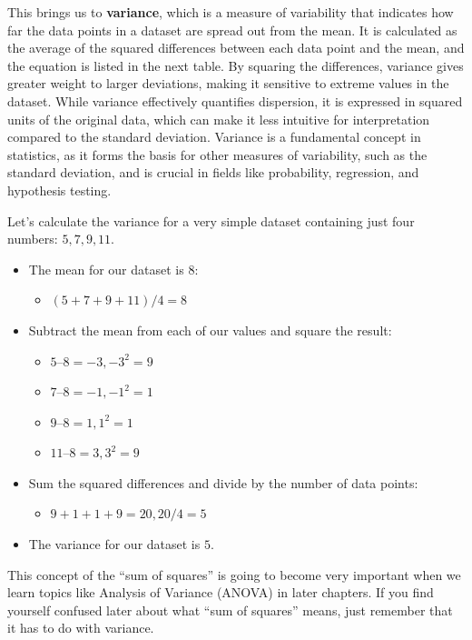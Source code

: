 \documentclass[
  letterpaper,
  DIV=11,
  numbers=noendperiod]{scrreprt}
\providecommand{\tightlist}{%
  \setlength{\itemsep}{0pt}\setlength{\parskip}{0pt}}
\begin{document}
This brings us to \textbf{variance}, which is a measure of variability
that indicates how far the data points in a dataset are spread out from
the mean. It is calculated as the average of the squared differences
between each data point and the mean, and the equation is listed in the
next table. By squaring the differences, variance gives greater weight
to larger deviations, making it sensitive to extreme values in the
dataset. While variance effectively quantifies dispersion, it is
expressed in squared units of the original data, which can make it less
intuitive for interpretation compared to the standard deviation.
Variance is a fundamental concept in statistics, as it forms the basis
for other measures of variability, such as the standard deviation, and
is crucial in fields like probability, regression, and hypothesis
testing.

Let's calculate the variance for a very simple dataset containing just
four numbers: \(5, 7, 9, 11\).

\begin{itemize}
\item
  The mean for our dataset is \(8\):

  \begin{itemize}
  \tightlist
  \item
    \((5 + 7 + 9 + 11)/4 = 8\)
  \end{itemize}
\item
  Subtract the mean from each of our values and square the result:

  \begin{itemize}
  \item
    \(5 – 8 = -3, -3^2 = 9\)
  \item
    \(7 – 8 = -1, -1^2 = 1\)
  \item
    \(9 – 8 = 1, 1^2 = 1\)
  \item
    \(11 – 8 = 3, 3^2 = 9\)
  \end{itemize}
\item
  Sum the squared differences and divide by the number of data points:

  \begin{itemize}
  \tightlist
  \item
    \(9 + 1 + 1 + 9 = 20, 20/4 = 5\)
  \end{itemize}
\item
  The variance for our dataset is \(5\).
\end{itemize}

This concept of the ``sum of squares'' is going to become very important
when we learn topics like Analysis of Variance (ANOVA) in later
chapters. If you find yourself confused later about what ``sum of
squares'' means, just remember that it has to do with variance.
\end{document}
